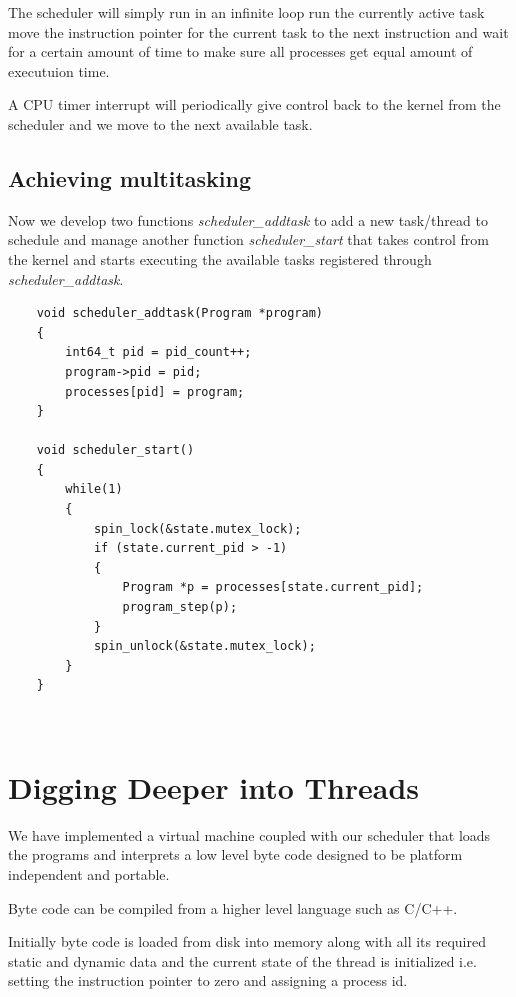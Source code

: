 \documentclass[12pt]{report}
\begin{document}
	The scheduler will simply run in an infinite loop run the currently active task
	move the instruction pointer for the current task to the next instruction and wait for
	a certain amount of time to make sure all processes get equal amount of executuion time.
	
	A CPU timer interrupt will periodically give control back to the kernel from the
	scheduler and we move to the next available task.

    \section{Achieving multitasking}
    Now we develop two functions \textit{scheduler\_addtask} to add a new task/thread
    to schedule and manage another function \textit{scheduler\_start} that takes control from
    the kernel and starts executing the available tasks registered through \textit{scheduler\_addtask}.

    \begin{verbatim}
    void scheduler_addtask(Program *program)
    {
        int64_t pid = pid_count++;
        program->pid = pid;
        processes[pid] = program;
    }

    void scheduler_start()
    {
        while(1) 
        {
            spin_lock(&state.mutex_lock);
            if (state.current_pid > -1)
            {
                Program *p = processes[state.current_pid];
                program_step(p);
            }
            spin_unlock(&state.mutex_lock);
        }
    }
    \end{verbatim}
    
    \begin{verbatim}
        
    \end{verbatim}

    \chapter{Digging Deeper into Threads}
    We have implemented a virtual machine coupled with our scheduler that loads the programs and interprets a low level byte code designed to be 
    platform independent and portable.

    Byte code  can be compiled from a higher level language such as C/C++.

    Initially byte code is loaded from disk into memory along with all its required static and 
    dynamic data and the current state of the thread is initialized i.e. setting the instruction 
    pointer to zero and assigning a process id.
\end{document}
